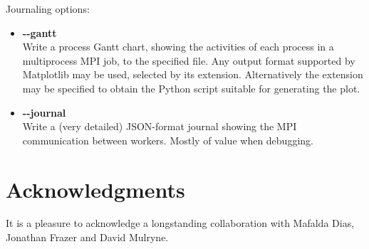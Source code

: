 \documentclass[11pt,a4paper]{article}
\renewcommand{\texttt}[1]{{\ttfamily\fontseries{l}\selectfont{#1}}}
\newcommand{\packagefont}{\sffamily}
\newcommand{\Matplotlib}{{\packagefont Matplotlib}}
\newcommand{\file}[1]{\texttt{{#1}}}
\newcommand{\option}[1]{{\ttfamily\bfseries\small #1}}
\begin{document}
\noindent Journaling options:
\begin{itemize}
	\item \option{{-}{-}gantt} \\
	Write a process Gantt chart, showing the activities of each process
	in a multiprocess MPI job, to the specified file.
	Any output format supported by {\Matplotlib} may be used,
	selected by its extension.
	Alternatively the extension \file{.py} may be specified to
	obtain the Python script suitable for generating the plot.
	
	\item \option{{-}{-}journal} \\
	Write a (very detailed) JSON-format journal showing the MPI
	communication between workers. Mostly of value when debugging.
\end{itemize}



%


\section{Acknowledgments}
It is a pleasure to acknowledge a longstanding collaboration
with
Mafalda Dias,
Jonathan Frazer
and David Mulryne.
\end{document}

